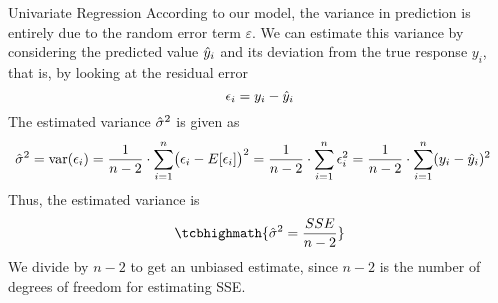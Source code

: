 \begin{frame}{Univariate Regression}
According to our model, the variance in prediction is entirely due to the random error
term $\varepsilon$.
We can estimate this variance by
considering the predicted value $\hat{y}_i$ and its deviation from the
true response $y_i$, that is, by looking at the residual error
\begin{equation*}
    \epsilon_i = y_i - \hat{y}_i
\end{equation*}
%
%
The estimated variance $\hat{\sigma}^2$ is given as
\begin{align*}
    \hat{\sigma}^2 & = \operatorname{var}(\epsilon_i)
    = \frac{1}{n-2} \cdot \sum_{i=1}^n \bigl(\epsilon_i -
    E[\epsilon_i]\bigr)^2
    = \frac{1}{n-2} \cdot \sum_{i=1}^n \epsilon_i^2
    = \frac{1}{n-2} \cdot \sum_{i=1}^n (y_i - \hat{y}_i)^2
\end{align*}
Thus, the estimated variance is
\begin{align*}
    \tcbhighmath{
    \hsigma^2 = \frac{SSE}{n-2} }
\end{align*}
We divide by $n-2$ to get an unbiased estimate, 
since $n-2$ is the number of degrees of freedom for
estimating SSE.%
\end{frame}
%
